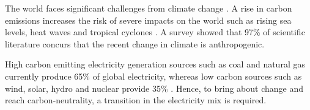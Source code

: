 
The world faces significant challenges from climate change \cite{Masson-Delmotte2018}. A rise in carbon emissions increases the risk of severe impacts on the world such as rising sea levels, heat waves and tropical cyclones \cite{IPCC2014}. A survey \cite{Cook2013} showed that 97\% of scientific literature concurs that the recent change in climate is anthropogenic.

 High carbon emitting electricity generation sources such as coal and natural gas currently produce 65\% of global electricity, whereas low carbon sources such as wind, solar, hydro and nuclear provide 35\% \cite{BP2018,Hall1983}. Hence, to bring about change and reach carbon-neutrality, a transition in the electricity mix is required.











